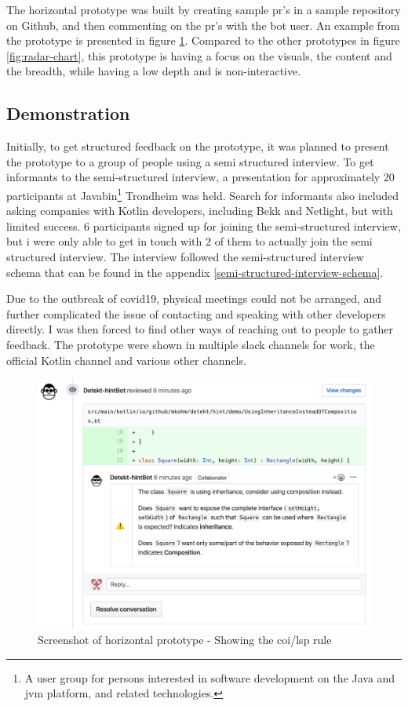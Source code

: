 \documentclass{report}
\begin{document}
The horizontal prototype was built by creating sample \gls{pr}'s in a sample repository on Github\cite{sample-repository}, and then commenting on the \gls{pr}'s with the bot user. An example from the prototype is presented in figure \ref{fig:liskov}. Compared to the other prototypes in figure \ref{fig:radar-chart}, this prototype is having a focus on the visuals, the content and the breadth, while having a low depth and is non-interactive.

\subsection*{Demonstration}
Initially, to get structured feedback on the prototype, it was planned to present the prototype to a group of people using a semi structured interview. To get informants to the semi-structured interview, a presentation for approximately 20 participants at Javabin\footnote{A user group for persons interested in software development on the Java and \gls{jvm} platform, and related technologies.} Trondheim was held. Search for informants also included asking companies with Kotlin developers, including Bekk and Netlight, but with limited success. 6 participants signed up for joining the semi-structured interview, but i were only able to get in touch with 2 of them to actually join the semi structured interview. The interview followed the semi-structured interview schema that can be found in the appendix \ref{semi-structured-interview-schema}.

Due to the outbreak of \gls{covid19}, physical meetings could not be arranged, and further complicated the issue of contacting and speaking with other developers directly. I was then forced to find other ways of reaching out to people to gather feedback. The prototype were shown in multiple slack channels for work, the official Kotlin channel and various other channels.

\begin{figure}[h!]
    \centering
    \includegraphics[width=\textwidth]{../images/demo.png}
    \caption{Screenshot of horizontal prototype - Showing the \gls{coi}/\gls{lsp} rule}
    \label{fig:liskov}
\end{figure}
\end{document}
